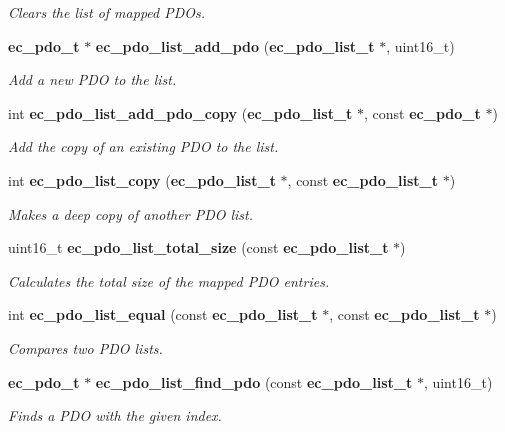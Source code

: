 \begin{DoxyCompactItemize}
\begin{DoxyCompactList}\small\item\em \-Clears the list of mapped \-P\-D\-Os. \end{DoxyCompactList}\item 
{\bf ec\-\_\-pdo\-\_\-t} $\ast$ {\bf ec\-\_\-pdo\-\_\-list\-\_\-add\-\_\-pdo} ({\bf ec\-\_\-pdo\-\_\-list\-\_\-t} $\ast$, uint16\-\_\-t)
\begin{DoxyCompactList}\small\item\em \-Add a new \-P\-D\-O to the list. \end{DoxyCompactList}\item 
int {\bf ec\-\_\-pdo\-\_\-list\-\_\-add\-\_\-pdo\-\_\-copy} ({\bf ec\-\_\-pdo\-\_\-list\-\_\-t} $\ast$, const {\bf ec\-\_\-pdo\-\_\-t} $\ast$)
\begin{DoxyCompactList}\small\item\em \-Add the copy of an existing \-P\-D\-O to the list. \end{DoxyCompactList}\item 
int {\bf ec\-\_\-pdo\-\_\-list\-\_\-copy} ({\bf ec\-\_\-pdo\-\_\-list\-\_\-t} $\ast$, const {\bf ec\-\_\-pdo\-\_\-list\-\_\-t} $\ast$)
\begin{DoxyCompactList}\small\item\em \-Makes a deep copy of another \-P\-D\-O list. \end{DoxyCompactList}\item 
uint16\-\_\-t {\bf ec\-\_\-pdo\-\_\-list\-\_\-total\-\_\-size} (const {\bf ec\-\_\-pdo\-\_\-list\-\_\-t} $\ast$)
\begin{DoxyCompactList}\small\item\em \-Calculates the total size of the mapped \-P\-D\-O entries. \end{DoxyCompactList}\item 
int {\bf ec\-\_\-pdo\-\_\-list\-\_\-equal} (const {\bf ec\-\_\-pdo\-\_\-list\-\_\-t} $\ast$, const {\bf ec\-\_\-pdo\-\_\-list\-\_\-t} $\ast$)
\begin{DoxyCompactList}\small\item\em \-Compares two \-P\-D\-O lists. \end{DoxyCompactList}\item 
{\bf ec\-\_\-pdo\-\_\-t} $\ast$ {\bf ec\-\_\-pdo\-\_\-list\-\_\-find\-\_\-pdo} (const {\bf ec\-\_\-pdo\-\_\-list\-\_\-t} $\ast$, uint16\-\_\-t)
\begin{DoxyCompactList}\small\item\em \-Finds a \-P\-D\-O with the given index. \end{DoxyCompactList}\item 

\end{DoxyCompactItemize}
